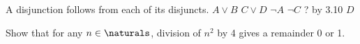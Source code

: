\documentclass{report}
\begin{document}
\begin{Answer} [number=11.2]
  \begin{structured_derivation}
    \begin{nested_derivation}
      \observation
        {A disjunction follows from each of its disjuncts.}
        {$A \lor B$}
      \observation
        {}
        {$C \lor D$}
      \observation
        {}
        {$\neg{A}$}
      \observation
        {}
        {$\neg{C}$}
      \observation
        {? by 3.10}
        {$D$}
    \end{nested_derivation}
  \end{structured_derivation}
\end{Answer}

\begin{Exercise} [number=15]
  Show that for any $n \in \naturals$, division of $n^2$ by 4 gives a remainder 0 or 1.
\end{Exercise}
\end{document}
